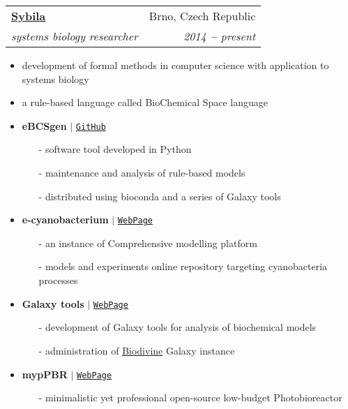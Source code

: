 \documentclass[letterpaper,11pt]{article}
\makeatletter
\newcommand{\resumeSubheading}[4]{
  \vspace{-2pt}\item
    \begin{tabular*}{0.97\textwidth}[t]{l@{\extracolsep{\fill}}r}
      \textbf{#1} & #2 \\
      \textit{\small#3} & \textit{\small #4} \\
    \end{tabular*}\vspace{-7pt}
}
\makeatother
\begin{document}
  \resumeSubheading
  {\href{https://sybila.fi.muni.cz/}{Sybila}}{Brno, Czech Republic}
  {systems biology researcher}{2014 \textbf{--} present}
  \small{
    \begin{itemize}
      \item development of formal methods in computer science with application to systems biology \vspace{-2pt}
      \item a rule-based language called BioChemical Space language \vspace{2pt}
      \item \textbf{eBCSgen} $|$ \href{https://github.com/sybila/eBCSgen}{\color{blue}\texttt{GitHub}} \vspace{-2pt}
      \begin{itemize}
        \item[-] software tool developed in Python \vspace{-2pt}
        \item[-] maintenance and analysis of rule-based models \vspace{-2pt}
        \item[-] distributed using bioconda and a series of Galaxy tools
      \end{itemize}
      \item \textbf{e-cyanobacterium} $|$ \href{https://www.e-cyanobacterium.org/}{\color{blue}\texttt{WebPage}} \vspace{-2pt}
      \begin{itemize}
        \item[-] an instance of Comprehensive modelling platform \vspace{-2pt}
        \item[-] models and experiments online repository targeting cyanobacteria processes \vspace{-2pt}
      \end{itemize}
      \item \textbf{Galaxy tools} $|$ \href{https://github.com/sybila/galaxytools}{\color{blue}\texttt{WebPage}} \vspace{-2pt}
      \begin{itemize}
        \item[-] development of Galaxy tools for analysis of biochemical models \vspace{-2pt}
        \item[-] administration of \href{https://biodivine-vm.fi.muni.cz/galaxy}{Biodivine} Galaxy instance \vspace{-2pt}
      \end{itemize}
      \item \textbf{mypPBR} $|$ \href{https://github.com/xtrojak/bioreactor}{\color{blue}\texttt{WebPage}} \vspace{-2pt}
      \begin{itemize}
        \item[-] minimalistic yet professional open-source low-budget Photobioreactor \vspace{-2pt}
      \end{itemize}
    \end{itemize}
  }
\end{document}
